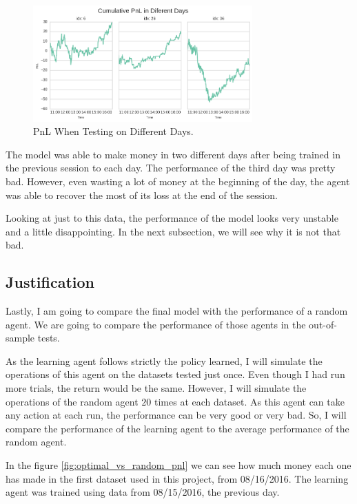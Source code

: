 \documentclass[a4paper]{article}
\begin{document}
\begin{figure}[ht]
\centering
\includegraphics[width=0.75\textwidth]{figures/pnl_diff_days.png}
\caption{\label{fig:pnl_diff_days}PnL When Testing on Different Days.}
\end{figure}

The model was able to make money in two different days after being trained in the previous session to each day. The performance of the third day was pretty bad. However, even wasting a lot of money at the beginning of the day, the agent was able to recover the most of its loss at the end of the session.

Looking at just to this data, the performance of the model looks very unstable and a little disappointing. In the next subsection, we will see why it is not that bad.


\subsection{Justification}
Lastly, I am going to compare the final model with the performance of a random agent. We are going to compare the performance of those agents in the out-of-sample tests.

As the learning agent follows strictly the policy learned, I will simulate the operations of this agent on the datasets tested just once. Even though I had run more trials, the return would be the same. However, I will simulate the operations of the random agent $20$ times at each dataset. As this agent can take any action at each run, the performance can be very good or very bad. So, I will compare the performance of the learning agent to the average performance of the random agent.

In the figure \ref{fig:optimal_vs_random_pnl} we can see how much money each one has made in the first dataset used in this project, from 08/16/2016. The learning agent was trained using data from 08/15/2016, the previous day.
\end{document}
